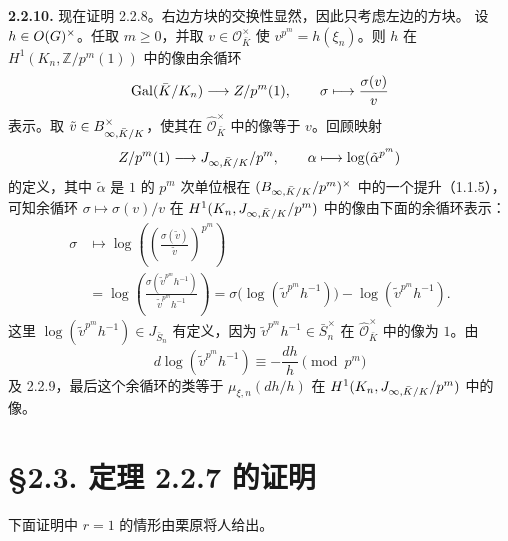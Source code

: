 \noindent\textbf{2.2.10.} 现在证明 2.2.8。右边方块的交换性显然，因此只考虑左边的方块。
设 $h\in O(G)^\times$。任取 $m\geq0$，并取
$v\in\mathcal O_{\bar K}^\times$ 使 $v^{p^m}=h(\xi_n)$。则 $h$ 在
$H^1(K_n,\mathbb Z/p^m(1))$ 中的像由余循环
\[
\operatorname{Gal}(\bar K/K_n)\longrightarrow Z/p^m(1),
\qquad\sigma\longmapsto\frac{\sigma(v)}v
\]
表示。取 $\tilde v\in B_{\infty,\bar K/K}^\times$，使其在
$\widehat{\mathcal O}_{\bar K}^\times$ 中的像等于 $v$。回顾映射
\[
Z/p^m(1)\longrightarrow J_{\infty,\bar K/K}/p^m,
\qquad\alpha\longmapsto\log(\tilde\alpha^{p^m})
\]
的定义，其中 $\tilde\alpha$ 是 $1$ 的 $p^m$ 次单位根在
$(B_{\infty,\bar K/K}/p^m)^\times$ 中的一个提升（1.1.5），可知余循环
$\sigma\mapsto\sigma(v)/v$ 在 $H^1(K_n,J_{\infty,\bar K/K}/p^m)$ 中的像由下面的余循环表示：
\begin{align*}
\sigma&\longmapsto\log\left(\left(\frac{\sigma(\tilde v)}{\tilde v}\right)^{p^m}\right)\\
&=\log\left(\frac{\sigma(\tilde v^{p^m}h^{-1})}{\tilde v^{p^m}h^{-1}}\right)
=\sigma\bigl(\log(\tilde v^{p^m}h^{-1})\bigr)-\log(\tilde v^{p^m}h^{-1}).
\end{align*}
这里 $\log(\tilde v^{p^m}h^{-1})\in J_{\bar S_n}$ 有定义，因为
$\tilde v^{p^m}h^{-1}\in\bar S_n^\times$ 在
$\widehat{\mathcal O}_{\bar K}^\times$ 中的像为 $1$。由
\[
d\log(\tilde v^{p^m}h^{-1})\equiv-\frac{dh}{h}\pmod{p^m}
\]
及 2.2.9，最后这个余循环的类等于 $\mu_{\xi,n}(dh/h)$ 在
$H^1(K_n,J_{\infty,\bar K/K}/p^m)$ 中的像。

\section*{§2.3. 定理 2.2.7 的证明}
下面证明中 $r=1$ 的情形由栗原将人给出。


